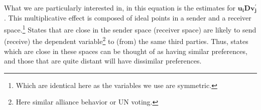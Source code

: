 What we are particularly interested in, in this equation is the estimates for $\mathbf{u_{i}Dv^{'}_{j}}$. This multiplicative effect is composed of ideal points in a sender and a receiver space.\footnote{Which are identical here as the variables we use are symmetric.} States that are close in the sender space (receiver space) are likely to send (receive) the dependent variable\footnote{Here similar alliance behavior or UN voting.} to (from) the same third parties. Thus, states which are close in these spaces can be thought of as having similar preferences, and those that are quite distant will have dissimilar preferences.




